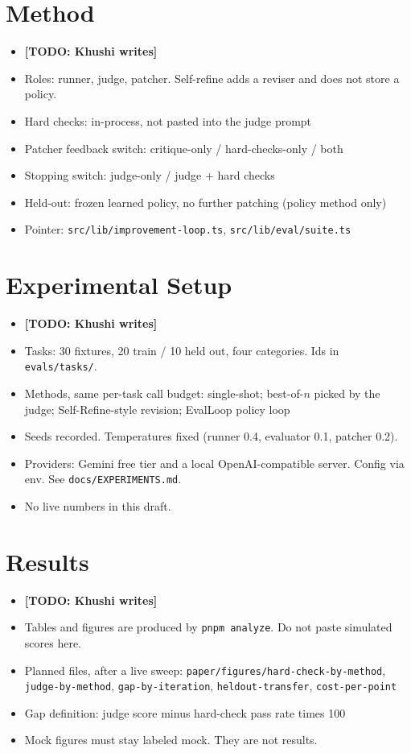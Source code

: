 \documentclass{article}
\newcommand{\todo}[1]{\textbf{[TODO: #1]}}
\begin{document}
\section{Method}
\begin{itemize}
  \item \todo{Khushi writes}
  \item Roles: runner, judge, patcher. Self-refine adds a reviser and does not store a policy.
  \item Hard checks: in-process, not pasted into the judge prompt
  \item Patcher feedback switch: critique-only / hard-checks-only / both
  \item Stopping switch: judge-only / judge + hard checks
  \item Held-out: frozen learned policy, no further patching (policy method only)
  \item Pointer: \texttt{src/lib/improvement-loop.ts}, \texttt{src/lib/eval/suite.ts}
\end{itemize}

\section{Experimental Setup}
\begin{itemize}
  \item \todo{Khushi writes}
  \item Tasks: 30 fixtures, 20 train / 10 held out, four categories. Ids in \texttt{evals/tasks/}.
  \item Methods, same per-task call budget: single-shot; best-of-$n$ picked by the judge; Self-Refine-style revision; EvalLoop policy loop
  \item Seeds recorded. Temperatures fixed (runner 0.4, evaluator 0.1, patcher 0.2).
  \item Providers: Gemini free tier and a local OpenAI-compatible server. Config via env. See \texttt{docs/EXPERIMENTS.md}.
  \item No live numbers in this draft.
\end{itemize}

\section{Results}
\begin{itemize}
  \item \todo{Khushi writes}
  \item Tables and figures are produced by \texttt{pnpm analyze}. Do not paste simulated scores here.
  \item Planned files, after a live sweep: \texttt{paper/figures/hard-check-by-method}, \texttt{judge-by-method}, \texttt{gap-by-iteration}, \texttt{heldout-transfer}, \texttt{cost-per-point}
  \item Gap definition: judge score minus hard-check pass rate times 100
  \item Mock figures must stay labeled mock. They are not results.
\end{itemize}
\end{document}

